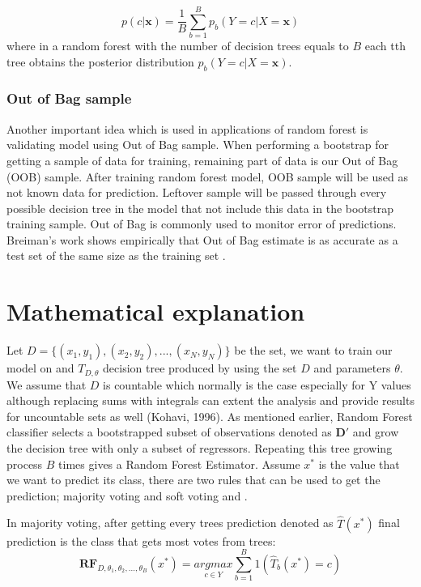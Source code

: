 \begin{equation}
	p(c|\textbf{x}) =  \frac{1}{B} \displaystyle\sum_{b=1}^{B} p_{b}(Y = c |X = \textbf{x})
\end{equation}
where in a random forest with the number of decision trees equals to $B$ each tth tree obtains the posterior 
distribution $ p_{b}(Y = c |X = \textbf{x}) $.

\subsubsection {Out of Bag sample}
Another important idea which is used in applications of random forest is validating model using Out of Bag sample.
When performing a bootstrap for getting a sample of data for training,
remaining part of data is our Out of Bag (OOB) sample.
After training random forest model, OOB sample will be used as not known data for prediction.
Leftover sample will be passed through every possible decision tree in the model that not include this
data in the bootstrap training sample. Out of Bag is commonly used to monitor error of predictions. 
Breiman’s work \cite{Breiman1996OUT-OF-BAG-E} shows empirically that Out of Bag estimate is as accurate 
as a test set of the same size as the training set \cite{Breiman1996OUT-OF-BAG-E}.


\section{Mathematical explanation}

Let $D = \{(x_{1},y_{1}), (x_{2}, y_{2}), ... , (x_{N}, y_{N})\}$ be the set, we want to train our model on and $T_{D, \theta}$ 
decision tree produced by using the set $D$ and parameters $\theta$. We assume that $D$ is countable which normally is the 
case especially for Y values although replacing sums with integrals can extent the analysis and 
provide results for uncountable sets as well (Kohavi, 1996). As mentioned earlier, 
Random Forest classifier selects a bootstrapped subset of observations denoted as $\boldsymbol{D'}$ and 
grow the decision tree with only a subset of regressors. Repeating this tree growing process $B$ times 
gives a Random Forest Estimator. Assume $x^*$ is the value that we want to predict its class, 
there are two rules that can be used to get the prediction; majority voting and 
soft voting \cite{louppe2014understanding} and \cite{Zhou2014DrugBank}.

In majority voting, after getting every trees prediction denoted as $\hat{T}(x^*)$ final prediction is the class that gets most votes from trees:
\begin{equation}
\boldsymbol{RF}_{D, \theta_{1}, \theta_{2}, ..., \theta_{B}} (x^*) =
	\underset{c \in Y}{argmax} \sum_{b = 1}^{B}{1(\hat{T}_{b}(x^*) = c)}
\end{equation}


